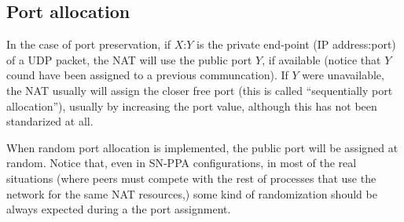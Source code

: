 \subsection{Port allocation}
In the case of port preservation, if $X$:$Y$ is the private end-point
(IP address:port) of a UDP packet, the NAT will use the public port
$Y$, if available (notice that $Y$ cound have been assigned to a
previous communcation). If $Y$ were unavailable, the NAT usually will
assign the closer free port (this is called ``sequentially port
allocation''), usually by increasing the port value, although this has
not been standarized at all.

When random port allocation is implemented, the public port will be
assigned at random. Notice that, even in SN-PPA configurations, in
most of the real situations (where peers must compete with the rest of
processes that use the network for the same NAT resources,) some kind
of randomization should be always expected during a the port
assignment.

